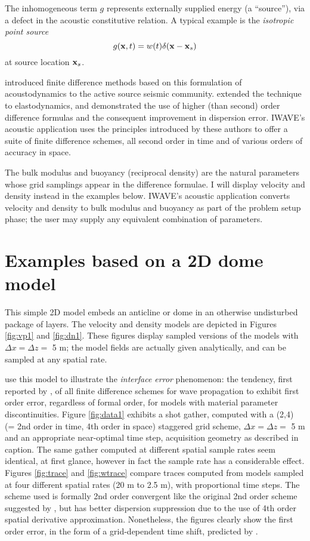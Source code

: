 The inhomogeneous term $g$ represents externally supplied energy (a
``source''), via a defect in the acoustic constitutive relation. A
typical example is the {\em isotropic point source}
\[
g({\bf x},t) = w(t) \delta({\bf x}-{\bf x}_s)
\]
at source location ${\bf x}_s$.

\cite{Vir:84} introduced finite difference methods based on this
formulation of acoustodynamics to the active source seismic
community. \cite{Vir:86} extended the technique to elastodynamics, and
\cite{Lev:88} demonstrated the use of higher (than second) order
difference formulas and the consequent improvement in dispersion
error.  IWAVE's acoustic application uses the principles introduced by
these authors to offer a suite of finite difference schemes, all
second order in time and of various orders of accuracy in space.

The bulk modulus and buoyancy (reciprocal density) are the natural
parameters whose grid samplings appear in the difference formulae. I will
display velocity and density instead in the examples below. IWAVE's acoustic application
converts velocity and density to bulk modulus and buoyancy as part of
the problem setup phase; the user may supply any equivalent combination of parameters.

\section{Examples based on a 2D dome model}

This simple 2D model embeds an anticline or dome in an otherwise
undisturbed package of layers. The velocity and density models are
depicted in Figures \ref{fig:vp1} and \ref{fig:dn1}. These
figures display sampled versions of the models with $\Delta x = \Delta
z = $ 5 m; the model fields are actually given analytically, and can
be sampled at any spatial rate.

\cite{SymesVdovina:09} use this model to illustrate the {\em
  interface error} phenomenon: the tendency, first reported by
\cite{Brown:84}, of all finite difference schemes for wave
propagation to exhibit first order error, regardless of formal order,
for models with material parameter discontinuities. 
Figure \ref{fig:data1} exhibits a shot gather, computed with a (2,4) (= 2nd order in time,
4th order in space) staggered grid scheme, $\Delta
x = \Delta z = $ 5 m and an appropriate near-optimal time step, acquisition geometry as described in
caption. The same gather computed at different spatial sample rates
seem identical, at first glance, however in fact the sample rate has a considerable effect. Figures
\ref{fig:trace} and \ref{fig:wtrace} compare traces computed from models sampled
at four different spatial rates (20 m to 2.5 m), with proportional
time steps. The scheme used is formally 2nd order
convergent like the original 2nd order scheme suggested by
\cite{Vir:84}, but has better dispersion suppression due to the use of
4th order spatial derivative approximation. Nonetheless,
the figures clearly show the first order error, in the form of a
grid-dependent time shift, predicted by \cite{Brown:84}. 

